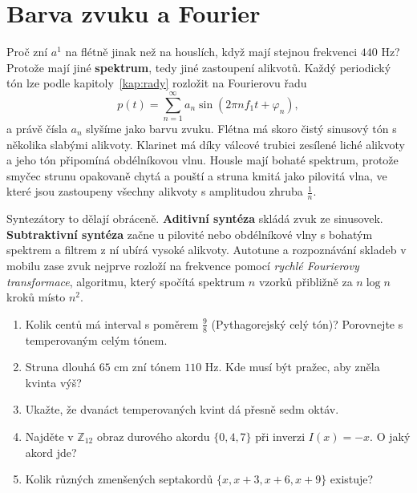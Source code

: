 \section{Barva zvuku a Fourier}

Proč zní $a^1$ na flétně jinak než na houslích, když mají stejnou frekvenci $440$ Hz? Protože mají jiné \textbf{spektrum}, tedy jiné zastoupení alikvotů. Každý periodický tón lze podle kapitoly~\ref{kap:rady} rozložit na Fourierovu řadu
\begin{equation*}
  p(t) = \sum_{n=1}^{\infty}a_n\sin(2\pi nf_1t + \varphi_n),
\end{equation*}
a právě čísla $a_n$ slyšíme jako barvu zvuku. Flétna má skoro čistý sinusový tón s několika slabými alikvoty. Klarinet má díky válcové trubici zesílené liché alikvoty a jeho tón připomíná obdélníkovou vlnu. Housle mají bohaté spektrum, protože smyčec strunu opakovaně chytá a pouští a struna kmitá jako pilovitá vlna, ve které jsou zastoupeny všechny alikvoty s amplitudou zhruba $\frac{1}{n}$.

Syntezátory to dělají obráceně. \textbf{Aditivní syntéza} skládá zvuk ze sinusovek. \textbf{Subtraktivní syntéza} začne u pilovité nebo obdélníkové vlny s bohatým spektrem a filtrem z ní ubírá vysoké alikvoty. Autotune a rozpoznávání skladeb v mobilu zase zvuk nejprve rozloží na frekvence pomocí \textit{rychlé Fourierovy transformace}, algoritmu, který spočítá spektrum $n$ vzorků přibližně za $n\log n$ kroků místo $n^2$.

\begin{problem}
  \begin{enumerate}[label=(\alph*)]
    \item Kolik centů má interval s poměrem $\frac{9}{8}$ (Pythagorejský celý tón)? Porovnejte s temperovaným celým tónem.
    \item Struna dlouhá $65$ cm zní tónem $110$ Hz. Kde musí být pražec, aby zněla kvinta výš?
    \item Ukažte, že dvanáct temperovaných kvint dá přesně sedm oktáv.
    \item Najděte v $\mathbb{Z}_{12}$ obraz durového akordu $\{0, 4, 7\}$ při inverzi $I(x) = -x$. O jaký akord jde?
    \item Kolik různých zmenšených septakordů $\{x, x + 3, x + 6, x + 9\}$ existuje?
  \end{enumerate}
\end{problem}

